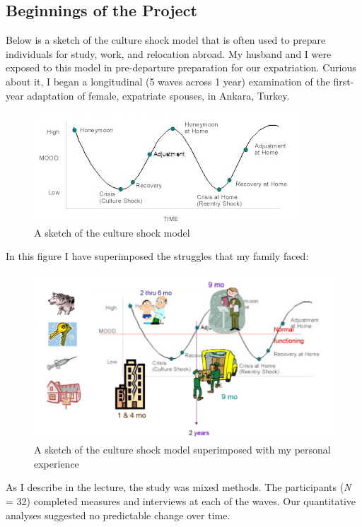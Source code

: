 \documentclass[
  english,
]{book}
\begin{document}
\hypertarget{beginnings-of-the-project}{%
\subsection{Beginnings of the Project}\label{beginnings-of-the-project}}

Below is a sketch of the culture shock model that is often used to prepare individuals for study, work, and relocation abroad. My husband and I were exposed to this model in pre-departure preparation for our expatriation. Curious about it, I began a longitudinal (5 waves across 1 year) examination of the first-year adaptation of female, expatriate spouses, in Ankara, Turkey.

\begin{figure}
\centering
\includegraphics{images/Qualitative/Wcurve.png}
\caption{A sketch of the culture shock model}
\end{figure}

In this figure I have superimposed the struggles that my family faced:

\begin{figure}
\centering
\includegraphics{images/Qualitative/myWcurve.jpg}
\caption{A sketch of the culture shock model superimposed with my personal experience}
\end{figure}

As I describe in the lecture, the study was mixed methods. The participants (\emph{N} = 32) completed measures and interviews at each of the waves. Our quantitative analyses suggested no predictable change over time.
\end{document}
